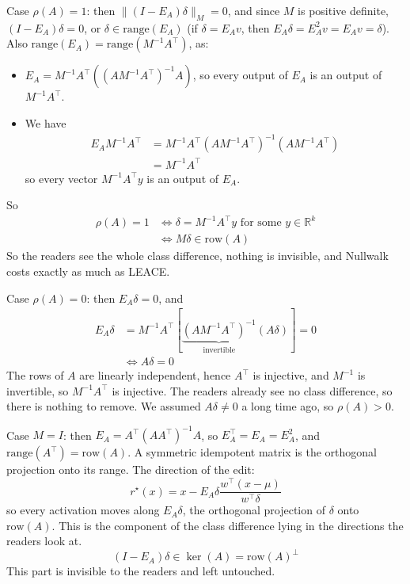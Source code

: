 \documentclass[10pt,a4paper,twocolumn]{article}
\newcommand{\R}{\mathbb{R}}
\begin{document}
	Case $\rho(A) = 1$: then $\| (I - E_A) \delta \|_M = 0$, and since $M$ is positive definite, $(I - E_A) \delta = 0$, or $\delta \in \mathrm{range}(E_A)$ (if $\delta = E_A v$, then $E_A \delta = E_A^2 v = E_A v = \delta$). Also $\mathrm{range}(E_A) = \mathrm{range}(M^{-1} A^\top)$, as:
	\begin{itemize}
		\item $E_A = M^{-1} A^\top \left( (A M^{-1} A^\top)^{-1} A \right)$, so every output of $E_A$ is an output of $M^{-1} A^\top$.
		\item We have
		$$\begin{aligned}
			E_A M^{-1} A^\top & = M^{-1} A^\top (A M^{-1} A^\top)^{-1} (A M^{-1} A^\top) \\
			& = M^{-1} A^\top
		\end{aligned}$$
		so every vector $M^{-1} A^\top y$ is an output of $E_A$.
	\end{itemize}
	So
	$$\begin{aligned}
		\rho(A) = 1 & \iff \delta = M^{-1} A^\top y \text{ for some } y \in \R^k \\
		& \iff M \delta \in \mathrm{row}(A)
	\end{aligned}$$
	So the readers see the whole class difference, nothing is invisible, and Nullwalk costs exactly as much as LEACE.

	Case $\rho(A) = 0$: then $E_A \delta = 0$, and
	$$\begin{aligned}
		E_A \delta & = M^{-1} A^\top \left[ \underbrace{(A M^{-1} A^\top)^{-1}}_{\text{invertible}} (A \delta) \right] = 0 \\
		& \iff A \delta = 0
	\end{aligned}$$
	The rows of $A$ are linearly independent, hence $A^\top$ is injective, and $M^{-1}$ is invertible, so $M^{-1} A^\top$ is injective. The readers already see no class difference, so there is nothing to remove. We assumed $A \delta \ne 0$ a long time ago, so $\rho(A) > 0$.

	Case $M = I$: then $E_A = A^\top (A A^\top)^{-1} A$, so $E_A^\top = E_A = E_A^2$, and $\mathrm{range}(A^\top) = \mathrm{row}(A)$. A symmetric idempotent matrix is the orthogonal projection onto its range. The direction of the edit:
	$$r^\star(x) = x - E_A \delta \frac{w^\top (x - \mu)}{w^\top \delta}$$
	so every activation moves along $E_A \delta$, the orthogonal projection of $\delta$ onto $\mathrm{row}(A)$. This is the component of the class difference lying in the directions the readers look at.
	$$(I - E_A) \delta \in \ker(A) = \mathrm{row}(A)^\perp$$
	This part is invisible to the readers and left untouched.
\end{document}
